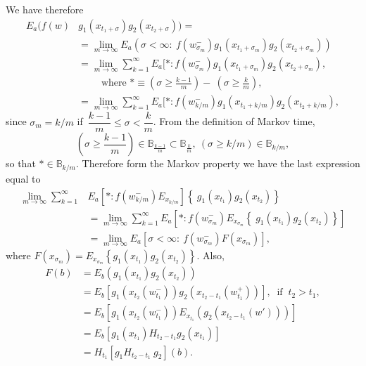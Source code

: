 We have therefore
\begin{align*}
   E_a (f (w) & g_1 (x_{t_{1} + \sigma}) g_2 ( x_{t_{2} + \sigma})) = \\
  &= \lim_{m \to \infty} E_a ( \sigma < \infty : ~ f
  (w^-_{\sigma_{m}}) g_1 (x_{t_{1} + \sigma_m}) g_2 (x_{t_{2} + \sigma_m}))\\ 
  & = \lim_{m \to \infty} \sum^{\infty}_{k=1} E_a \big[ * : f
    (w^-_{\sigma_{m}}) g_1 (x_{t_{1}+ \sigma_m}) g_2 (x_{t_{2}+
      \sigma_m}),\\
     & \qquad \text{ where } * \equiv \left(\sigma \ge \frac{k-1}{m} \right)
    - ~ \left( \sigma \ge \frac{k}{m} \right) ,\\ 
    & = \lim_{m \to \infty} \sum^{\infty}_{k=1} E_a \big[ * : f
      (w^-_{k/m}) g_1 (x_{t_{1}+ k/m}) g_2 (x_{t_{2} + k/m} ),
\end{align*}
since $\sigma_m = k/m$ if\ $\dfrac{k-1}{m} \leq \sigma <
\dfrac{k}{m}$. From the definition of Markov time, 
$$
\left( \sigma \ge \frac{k-1}{m}\right) \in \mathbb{B}_{\frac{k-1}{m}} \subset
\mathbb{B}_{\frac{k}{m}}, ~ ( \sigma \ge k/m ) \in \mathbb{B}_{k/m}, 
$$\pageoriginale
so that $* \in \mathbb{B}_{k/m}$. Therefore form the Markov property
 we have the last expression equal to 
\begin{align*}
  \lim_{m \to \infty} \sum^{\infty}_{k=1}& E_a \left [*: f (w^- _{k/m})
    E_{x_{k/m}} \right] \left \{ ~ g_1 (x_{t_{1}}) g_2 (x_{t_{2}})
  \right \} \\ 
  &= \lim_{m \to \infty} \sum^{\infty}_{k=1} E_a \left[*: f (w^- _{\sigma_m}) E_{x_{\sigma_{m}}} \left \{ ~ g_1 (x_{t_{1}}) g_2
    (x_{t_{2}}) \right \}\right] \\ 
  &= \lim_{m \to \infty} E_a \left [ \sigma < \infty: ~ f
    (w^-_{\sigma_{m}}) F (x_{\sigma_{m}}) \right ] , 
 \end{align*} 
where $F (x_{\sigma_{m}}) = E_{x_{\sigma_{m}}} \left \{ g_1
 (x_{t_{1}}) g_2 (x_{t_{2}}) \right \} $. Also, 
 \begin{align*}
   F(b)  &= E_b ( g_1 (x_{t_{1}}) g_2 (x_{t_{2}})) \\
   &= E_b \left[ g_1 (x_{t_{2}} (w^-_{t_{1}})) g_2 (x_{t_{2}-t_1}
     (w_{t_{1}}^+)) \right ], ~ \text{ if } ~ t_2 > t_1 , \\ 
   &= E_b \left[g_1 (x_{t_{2}} (w^-_{t_{1}})) E_{x_{t_{1}}} (g_2
     (x_{t_{2}-t_1}  (w'))) \right] \\ 
   &= E_b \left[ g_1 (x_{t_{1}}) H_{t_{2}-t_1}  g_2 (x_{t_{1}} ) \right ] \\
   &= H_{t_{1}} \left [ g_1  H_{t_{2}-t_1} ~ g_2 \right ] (b).
 \end{align*}

